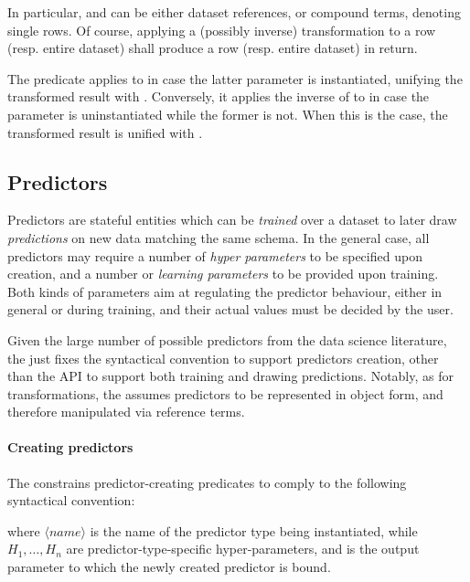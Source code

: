 \documentclass[12pt,a4paper,openright,twoside]{book}
\begin{document}
In particular,  and  can be either dataset references, or compound terms, denoting single rows.
%
Of course, applying a (possibly inverse) transformation to a row (resp. entire dataset) shall produce a row (resp. entire dataset) in return.

The predicate applies  to  in case the latter parameter is instantiated, unifying the transformed result with .
%
Conversely, it applies the inverse of  to  in case the  parameter is uninstantiated while the former is not.
%
When this is the case, the transformed result is unified with .

\subsection{Predictors}

Predictors are stateful entities which can be \emph{trained} over a dataset to later draw \emph{predictions} on new data matching the same schema.
%
In the general case, all predictors may require a number of \emph{hyper parameters} to be specified upon creation, and a number or \emph{learning parameters} to be provided upon training.
%
Both kinds of parameters aim at regulating the predictor behaviour, either in general or during training, and their actual values must be decided by the user.

Given the large number of possible predictors from the data science literature, the \mllib{} just fixes the syntactical convention to support predictors creation, other than the API to support both training and drawing predictions.
%
Notably, as for transformations, the \mllib{} assumes predictors to be represented in object form, and therefore manipulated via reference terms.

\paragraph{Creating predictors}

The \mllib{} constrains predictor-creating predicates to comply to the following syntactical convention:
%
\begin{center}
\end{center}
%
where $\langle \mathit{name} \rangle$ is the name of the predictor type being instantiated, while $H_1, \ldots, H_n$ are predictor-type-specific hyper-parameters, and  is the output parameter to which the newly created predictor is bound.
\end{document}
